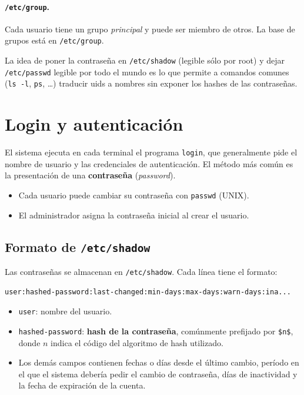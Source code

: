 \documentclass[11pt,a4paper]{article}
\begin{document}
\paragraph{\texttt{/etc/group}.}
Cada usuario tiene un grupo \emph{principal} y puede ser miembro de
otros. La base de grupos está en \verb|/etc/group|.

\begin{idea}
La idea de poner la contraseña en \verb|/etc/shadow| (legible sólo por
root) y dejar \verb|/etc/passwd| legible por todo el mundo es lo que
permite a comandos comunes (\texttt{ls -l}, \texttt{ps}, \ldots)
traducir uids a nombres sin exponer los hashes de las contraseñas.
\end{idea}

\section{Login y autenticación}

El sistema ejecuta en cada terminal el programa \texttt{login}, que
generalmente pide el nombre de usuario y las credenciales de
autenticación. El método más común es la presentación de una
\textbf{contraseña} (\emph{password}).

\begin{itemize}[leftmargin=*,nosep]
    \item Cada usuario puede cambiar su contraseña con \texttt{passwd}
        (UNIX).
    \item El administrador asigna la contraseña inicial al crear el
        usuario.
\end{itemize}

\subsection{Formato de \texttt{/etc/shadow}}

Las contraseñas se almacenan en \verb|/etc/shadow|. Cada línea tiene
el formato:

\begin{lstlisting}[style=textstyle]
user:hashed-password:last-changed:min-days:max-days:warn-days:ina...
\end{lstlisting}

\begin{itemize}[leftmargin=*]
    \item \texttt{user}: nombre del usuario.
    \item \texttt{hashed-password}: \textbf{hash de la contraseña},
        comúnmente prefijado por \verb|$n$|, donde $n$ indica el código
        del algoritmo de hash utilizado.
    \item Los demás campos contienen fechas o días desde el último
        cambio, período en el que el sistema debería pedir el cambio
        de contraseña, días de inactividad y la fecha de expiración de
        la cuenta.
\end{itemize}
\end{document}
